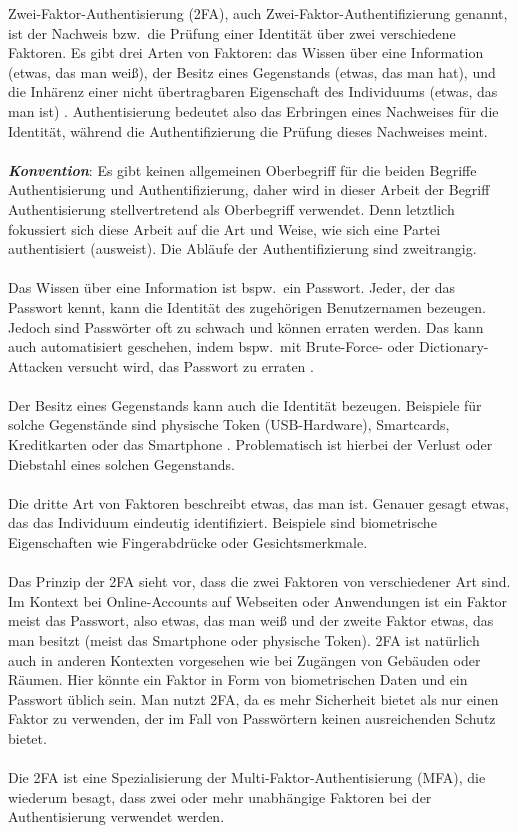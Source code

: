 Zwei-Faktor-Authentisierung (2FA), auch Zwei-Faktor-Authentifizierung genannt, ist 
der Nachweis bzw.\ die Prüfung einer Identität über zwei verschiedene Faktoren. Es 
gibt drei Arten von Faktoren: das Wissen über eine Information (etwas, das man 
weiß), der Besitz eines Gegenstands (etwas, das man hat), und die Inhärenz einer 
nicht übertragbaren Eigenschaft des Individuums (etwas, das man ist) \autocite[2]{Marky}. 
Authentisierung bedeutet also das Erbringen eines Nachweises für die Identität, 
während die Authentifizierung die Prüfung dieses Nachweises meint.
\\\\
\textit{\textbf{Konvention}}:
Es gibt keinen allgemeinen Oberbegriff für die beiden Begriffe \glqq Authentisierung\grqq{} und \glqq Authentifizierung\grqq{}, daher wird in dieser Arbeit der 
Begriff \glqq Authentisierung\grqq{} stellvertretend als Oberbegriff verwendet. Denn 
letztlich fokussiert sich diese Arbeit auf die Art und Weise, wie sich eine Partei authentisiert (ausweist). Die Abläufe der Authentifizierung sind zweitrangig.
\\\\
Das Wissen über eine Information ist bspw.\ ein Passwort. Jeder, der das Passwort 
kennt, kann die Identität des zugehörigen Benutzernamen bezeugen. Jedoch sind 
Passwörter oft zu schwach und können erraten werden. Das kann auch automatisiert 
geschehen, indem bspw.\ mit Brute-Force- oder Dictionary-Attacken versucht wird, das 
Passwort zu erraten \autocite[1162 \psqq]{Bosnjak}.
\\\\
Der Besitz eines Gegenstands kann auch die Identität bezeugen. Beispiele für 
solche Gegenstände sind physische Token (USB-Hardware), Smartcards, Kreditkarten 
oder das Smartphone \autocite[2]{Marky}. Problematisch ist hierbei der Verlust 
oder Diebstahl eines solchen Gegenstands.
\\\\
Die dritte Art von Faktoren beschreibt etwas, das man ist. Genauer gesagt etwas, das das Individuum eindeutig identifiziert. Beispiele sind biometrische Eigenschaften 
wie Fingerabdrücke oder Gesichtsmerkmale. \autocite[2]{Marky}
\\\\
Das Prinzip der 2FA sieht vor, dass die zwei Faktoren von verschiedener Art sind. Im 
Kontext bei Online-Accounts auf Webseiten oder Anwendungen ist ein Faktor meist das 
Passwort, also etwas, das man weiß und der zweite Faktor etwas, das man besitzt 
(meist das Smartphone oder physische Token). 2FA ist natürlich auch in anderen 
Kontexten vorgesehen wie bei Zugängen von Gebäuden oder Räumen. Hier könnte ein 
Faktor in Form von biometrischen Daten und ein Passwort üblich sein. Man nutzt 2FA, da es mehr Sicherheit bietet als nur einen Faktor zu verwenden, der im Fall von Passwörtern keinen ausreichenden Schutz bietet.
\\\\
Die 2FA ist eine Spezialisierung der Multi-Faktor-Authentisierung (MFA), die wiederum 
besagt, dass zwei oder mehr unabhängige Faktoren bei der Authentisierung verwendet 
werden.
